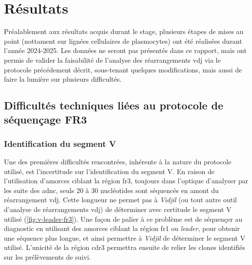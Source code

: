 \chapter{Résultats}

Préalablement aux résultats acquis durant le stage, plusieurs étapes de mises au point (nottament sur lignées cellulaires de plasmocytes) 
ont été réalisées durant l'année 2024-2025. Les données ne seront pas présentés dans ce rapport, mais ont permis de valider la faisabilité 
de l'analyse des réarrangements \gls{vdj} via le protocole précédement décrit, sous-tenant quelques modifications, mais aussi de faire 
la lumière sur plusieurs difficultés.

\section{Difficultés techniques liées au protocole de séquençage FR3}

\subsection{Identification du segment V}

Une des premières difficultés rencontrées, inhérente à la nature du protocole utilisé, est l'incertitude sur l'identification 
du segment V. En raison de l'utilisation d'amorces ciblant la région \gls{fr}3, toujours dans l'optique d'analyser par les suite 
des \gls{adnc}, seuls 20 à 30 nucléotides sont séquencés en amont du réarrangement \gls{vdj}. Cette longueur ne permet pas à 
\textit{Vidjil} (ou tout autre outil d'analyse de réarrangements \gls{vdj}) de déterminer avec certitude le segment V utilisé 
(\autoref{fig:v-leader-fr3}). 
Une façon de palier à ce problème est de séquençer au diagnostic en utilisant des amorces ciblant la région \gls{fr}1 ou 
\textit{leader}, pour obtenir une séquence plus longue, et ainsi permettre à \textit{Vidjil} de déterminer le segment V utilisé. 
L'unicité de la région \gls{cdr}3 permettra ensuite de relier les clones identifiés sur les prélèvements de suivi.

